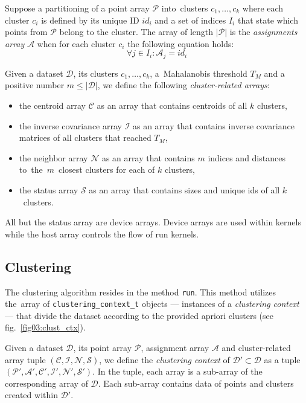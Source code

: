 \begin{defn}
	Suppose a partitioning of a point array $\mathcal{P}$ into~clusters $c_1,\dots,c_k$ where each cluster $c_i$ is defined by its unique ID $id_i$ and a set of indices $I_i$ that state which points from $\mathcal{P}$ belong to the cluster. The array of length $|\mathcal{P}|$ is the \emph{assignments array} $\mathcal{A}$ when for each cluster $c_i$ the following equation holds:
	$${\forall j \in I_i : \mathcal{A}_j = id_i}$$
	\label{def03:assign}
\end{defn}

\begin{defn}
	Given a dataset $\mathcal{D}$, its clusters $c_1,\dots,c_k$, a~Mahalanobis threshold $T_M$ and a positive number $m \le |\mathcal{D}|$, we define the following \emph{cluster-related arrays}:
	\begin{itemize}
		\item the centroid array $\mathcal{C}$ as an array that contains centroids of all $k$ clusters,
		\item the inverse covariance array $\mathcal{I}$ as an array that contains inverse covariance matrices of all clusters that reached $T_M$,
		\item the neighbor array $\mathcal{N}$ as an array that contains $m$ indices and distances to~the~$m$~closest clusters for each of $k$ clusters,
		\item the status array $\mathcal{S}$ as an array that contains sizes and unique ids of all $k$~clusters.
	\end{itemize}
	\label{def03:tuple}
\end{defn}


All but the status array are device arrays. Device arrays are used within kernels while the host array controls the flow of run kernels.  


\subsection{Clustering}
The clustering algorithm resides in the method \texttt{run}. This method utilizes the~array of \texttt{clustering\_context\_t} objects --- instances of a \emph{clustering context} --- that divide the dataset according to the provided apriori clusters (see fig.~\ref{fig03:clust_ctx}).

\begin{defn}
	Given a dataset $\mathcal{D}$, its point array $\mathcal{P}$, assignment array $\mathcal{A}$ and cluster-related array tuple $(\mathcal{C}, \mathcal{I}, \mathcal{N}, \mathcal{S})$, we define the \emph{clustering context} of $\mathcal{D}' \subset \mathcal{D}$ as a tuple $(\mathcal{P'}, \mathcal{A'}, \mathcal{C'}, \mathcal{I'}, \mathcal{N'}, \mathcal{S'})$. In the tuple, each array is a sub-array of the corresponding array of $\mathcal{D}$. Each sub-array contains data of points and clusters created within $\mathcal{D}'$.
	\label{def03:context}
\end{defn}

